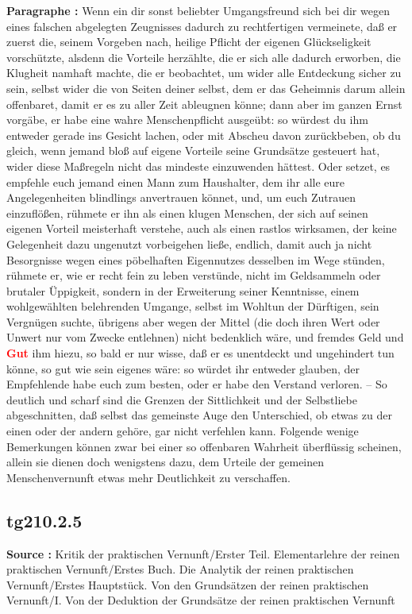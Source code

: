 \documentclass[a4paper,12pt,twoside]{book}
\newcommand{\match}[1]{\textcolor{red}{\textbf{#1}}}
\begin{document}
	\textbf{Paragraphe : }Wenn ein dir sonst beliebter Umgangsfreund sich bei dir wegen eines falschen abgelegten Zeugnisses dadurch zu rechtfertigen vermeinete, daß er zuerst die, seinem Vorgeben nach, heilige Pflicht der eigenen Glückseligkeit vorschützte, alsdenn die Vorteile herzählte, die er sich alle dadurch erworben, die Klugheit namhaft machte, die er beobachtet, um wider alle Entdeckung sicher zu sein, selbst wider die von Seiten deiner selbst, dem er das Geheimnis darum allein offenbaret, damit er es zu aller Zeit ableugnen könne; dann aber im ganzen Ernst vorgäbe, er habe eine wahre Menschenpflicht ausgeübt: so würdest du ihm entweder gerade ins Gesicht lachen, oder mit Abscheu davon zurückbeben, ob du gleich, wenn jemand bloß auf eigene Vorteile seine Grundsätze gesteuert hat, wider diese Maßregeln nicht das mindeste einzuwenden hättest. Oder setzet, es empfehle euch jemand einen Mann zum Haushalter, dem ihr alle eure Angelegenheiten blindlings anvertrauen könnet, und, um euch Zutrauen einzuflößen, rühmete er ihn als einen klugen Menschen, der sich auf seinen eigenen Vorteil meisterhaft verstehe, auch als einen rastlos wirksamen, der keine Gelegenheit dazu ungenutzt vorbeigehen ließe, endlich, damit auch ja nicht Besorgnisse wegen eines pöbelhaften Eigennutzes desselben im Wege stünden, rühmete er, wie er recht fein zu leben verstünde, nicht im Geldsammeln oder brutaler Üppigkeit, sondern in der Erweiterung seiner Kenntnisse, einem wohlgewählten belehrenden Umgange, selbst im Wohltun der Dürftigen, sein Vergnügen suchte, übrigens aber wegen der Mittel (die doch ihren Wert oder Unwert nur vom Zwecke entlehnen) nicht bedenklich wäre, und fremdes Geld und \match{Gut} ihm hiezu, so bald er nur wisse,  daß er es unentdeckt und ungehindert tun könne, so gut wie sein eigenes wäre: so würdet ihr entweder glauben, der Empfehlende habe euch zum besten, oder er habe den Verstand verloren. – So deutlich und scharf sind die Grenzen der Sittlichkeit und der Selbstliebe abgeschnitten, daß selbst das gemeinste Auge den Unterschied, ob etwas zu der einen oder der andern gehöre, gar nicht verfehlen kann. Folgende wenige Bemerkungen können zwar bei einer so offenbaren Wahrheit überflüssig scheinen, allein sie dienen doch wenigstens dazu, dem Urteile der gemeinen Menschenvernunft etwas mehr Deutlichkeit zu verschaffen. 
	
	\subsection*{tg210.2.5} 
	\textbf{Source : }Kritik der praktischen Vernunft/Erster Teil. Elementarlehre der reinen praktischen Vernunft/Erstes Buch. Die Analytik der reinen praktischen Vernunft/Erstes Hauptstück. Von den Grundsätzen der reinen praktischen Vernunft/I. Von der Deduktion der Grundsätze der reinen praktischen Vernunft\\  
	
\end{document}
